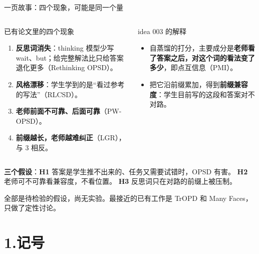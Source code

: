 \documentclass[aspectratio=169,11pt]{beamer}
\newcommand{\gnote}[1]{{\scriptsize\color{cGray}#1}}
\begin{document}
\begin{frame}{一页故事：四个现象，可能是同一个量}
\begin{columns}[T]
\begin{block}{已有论文里的四个现象}
\footnotesize
\begin{enumerate}
  \setlength\itemsep{2pt}
  \item \textbf{反思词消失}：thinking 模型少写 wait、but；给完整解法比只给答案退化更多（Rethinking OPSD）。
  \item \textbf{风格漂移}：学生学到的是“看过参考的写法”（RLCSD）。
  \item \textbf{老师前面不可靠、后面可靠}（PW-OPSD）。
  \item \textbf{前缀越长，老师越难纠正}（LGR），与 3 相反。
\end{enumerate}
\end{block}
\begin{block}{idea 003 的解释}
\footnotesize
\begin{itemize}
  \setlength\itemsep{2pt}
  \item 自蒸馏的打分，主要成分是\textbf{老师看了答案之后，对这个词的看法变了多少}，即点互信息（PMI）。
  \item 把它沿前缀累加，得到\textbf{前缀兼容度}：学生目前写的这段和答案对不对路。
\end{itemize}
\end{block}
\end{columns}
\vspace{4pt}
\small
\textbf{三个假设}：\textbf{H1} 答案是学生推不出来的、任务又需要试错时，OPSD 有害。
\textbf{H2} 老师可不可靠看兼容度，不看位置。
\textbf{H3} 反思词只在对路的前缀上被压制。\par\vspace{2pt}
\gnote{全部是待检验的假设，尚无实验。最接近的已有工作是 TrOPD 和 Many Faces，只做了定性讨论。}
\end{frame}

\section{1.\quad 记号}
\end{document}
